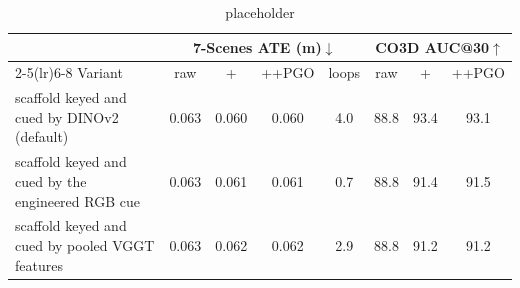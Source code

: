 \begin{table}[t]
\centering\scriptsize\setlength{\tabcolsep}{4pt}
\caption{placeholder}
\label{tab:ablation-key}
\begin{tabular}{@{}l ccc c ccc@{}}
\toprule
& \multicolumn{4}{c}{7-Scenes ATE (m)$\downarrow$} & \multicolumn{3}{c}{CO3D AUC@30$\uparrow$} \\
\cmidrule(lr){2-5}\cmidrule(lr){6-8}
Variant & raw & +\smr{} & +\smr{}+PGO & loops & raw & +\smr{} & +\smr{}+PGO \\
\midrule
scaffold keyed and cued by DINOv2 (default) & 0.063 & 0.060 & 0.060 & 4.0 & 88.8 & 93.4 & 93.1 \\
scaffold keyed and cued by the engineered RGB cue & 0.063 & 0.061 & 0.061 & 0.7 & 88.8 & 91.4 & 91.5 \\
scaffold keyed and cued by pooled VGGT features & 0.063 & 0.062 & 0.062 & 2.9 & 88.8 & 91.2 & 91.2 \\
\bottomrule
\end{tabular}
\end{table}
